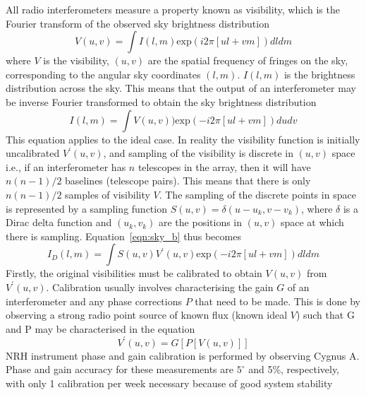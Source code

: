 All radio interferometers measure a property known as visibility, which is the Fourier transform of the observed sky brightness distribution
\begin{equation}
V(u,v)=\int I(l,m)\mathrm{exp}(i2\pi[ul +vm])dldm
\end{equation}
where $V$ is the visibility, $(u,v)$ are the spatial frequency of fringes on the sky, corresponding to the angular sky coordinates $(l,m)$. $I(l,m)$ is the brightness distribution across the sky. This means that the output of an interferometer may be inverse Fourier transformed to obtain the sky brightness distribution
\begin{equation}
I(l,m)=\int V(u,v))\mathrm{exp}(-i2\pi[ul +vm])dudv
\label{eqn:sky_b}
\end{equation}
This equation applies to the ideal case. In reality the visibility function is initially uncalibrated $V^{'}(u,v)$, and sampling of the visibility is discrete in $(u,v)$ space i.e., if an interferometer has $n$ telescopes in the array, then it will have $n(n-1)/2$ baselines (telescope pairs). This means that there is only $n(n-1)/2$ samples of visibility $V$. The sampling of the discrete points in space is represented by a sampling function $S(u,v) = \delta(u-u_k, v-v_k)$, where $\delta$ is a Dirac delta function and $(u_k, v_k)$ are the positions in $(u, v)$ space at which there is sampling. Equation~\ref{eqn:sky_b} thus becomes
\begin{equation}
I_D(l,m)=\int S(u,v)V^{'}(u,v)\mathrm{exp}(-i2\pi[ul +vm])dldm
\label{eqn:VS}
\end{equation}
Firstly, the original visibilities must be calibrated to obtain $V(u,v)$ from $V^{'}(u,v)$. Calibration usually involves characterising the gain $G$ of an interferometer and any phase corrections $P$ that need to be made. This is done by observing a strong radio point source of known flux (known ideal $V$) such that G and P may be characterised in the equation
\begin{equation}
V^{'}(u,v) = G[ P[V(u,v)] ]
\end{equation}
NRH instrument phase and gain calibration is performed by observing Cygnus A. Phase and gain accuracy for these measurements are $5^{\circ}$ and 5\%, respectively, with only 1 calibration per week necessary because of good system stability \citep{avignon1989}

